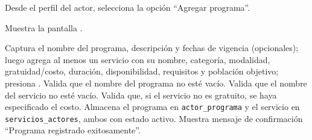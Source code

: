 \begin{UCtrayectoria}
	\UCpaso[\UCactor] Desde el perfil del actor, selecciona la opción ``Agregar programa''.
	
	\UCpaso Muestra la pantalla .
	
	
	\UCpaso[\UCactor] \label{CU-44.ingresaPrograma} Captura el nombre del programa, descripción y fechas de vigencia (opcionales); luego agrega al menos un servicio con su nombre, categoría, modalidad, gratuidad/costo, duración, disponibilidad, requisitos y población objetivo; presiona .
	\UCpaso Valida que el nombre del programa no esté vacío. 
	\UCpaso Valida que el nombre del servicio no esté vacío. 
	\UCpaso Valida que, si el servicio no es gratuito, se haya especificado el costo. 
	\UCpaso Almacena el programa en \texttt{actor\_programa} y el servicio en \texttt{servicios\_actores}, ambos con estado activo.
	\UCpaso Muestra mensaje de confirmación ``Programa registrado exitosamente''.
\end{UCtrayectoria}

